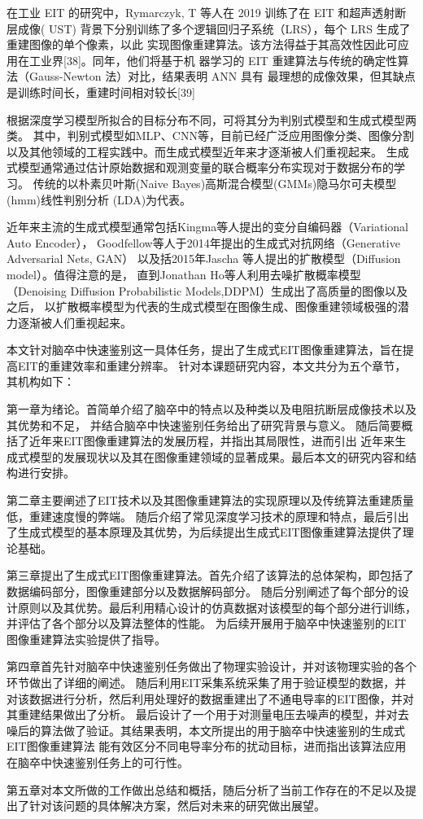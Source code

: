在工业 EIT 的研究中，Rymarczyk, T 等人在 2019 训练了在 EIT 和超声透射断层成像( UST)
背景下分别训练了多个逻辑回归子系统（LRS），每个 LRS 生成了重建图像的单个像素，以此
实现图像重建算法。该方法得益于其高效性因此可应用在工业界[38]。同年，他们将基于机
器学习的 EIT 重建算法与传统的确定性算法（Gauss-Newton 法）对比，结果表明 ANN 具有
最理想的成像效果，但其缺点是训练时间长，重建时间相对较长[39]


根据深度学习模型所拟合的目标分布不同，可将其分为判别式模型和生成式模型两类。
其中，判别式模型如MLP、CNN等，目前已经广泛应用图像分类、图像分割以及其他领域的工程实践中。而生成式模型近年来才逐渐被人们重视起来。
生成式模型通常通过估计原始数据和观测变量的联合概率分布实现对于数据分布的学习。
传统的以朴素贝叶斯(Naive Bayes)高斯混合模型(GMMs)隐马尔可夫模型(hmm)线性判别分析 (LDA)为代表。

近年来主流的生成式模型通常包括Kingma等人提出的变分自编码器（Variational Auto Encoder）\cite{2013Auto}，
Goodfellow等人于2014年提出的生成式对抗网络\cite{2014Generative}（Generative Adversarial Nets, GAN）
以及括2015年Jascha 等人提出的扩散模型\cite{DiffusionModel}（Diffusion model）。值得注意的是，
直到Jonathan Ho等人利用去噪扩散概率模型\cite{DDPM}（Denoising Diffusion Probabilistic Models,DDPM）生成出了高质量的图像以及之后，
以扩散概率模型为代表的生成式模型在图像生成、图像重建领域极强的潜力逐渐被人们重视起来。


本文针对脑卒中快速鉴别这一具体任务，提出了生成式EIT图像重建算法，旨在提高EIT的重建效率和重建分辨率。
针对本课题研究内容，本文共分为五个章节，其机构如下：

第一章为绪论。首简单介绍了脑卒中的特点以及种类以及电阻抗断层成像技术以及其优势和不足，
并结合脑卒中快速鉴别任务给出了研究背景与意义。 随后简要概括了近年来EIT图像重建算法的发展历程，并指出其局限性，进而引出
近年来生成式模型的发展现状以及其在图像重建领域的显著成果。最后本文的研究内容和结构进行安排。

第二章主要阐述了EIT技术以及其图像重建算法的实现原理以及传统算法重建质量低，重建速度慢的弊端。
随后介绍了常见深度学习技术的原理和特点，最后引出了生成式模型的基本原理及其优势，为后续提出生成式EIT图像重建算法提供了理论基础。

第三章提出了生成式EIT图像重建算法。首先介绍了该算法的总体架构，即包括了数据编码部分，图像重建部分以及数据解码部分。
随后分别阐述了每个部分的设计原则以及其优势。最后利用精心设计的仿真数据对该模型的每个部分进行训练，并评估了各个部分以及算法整体的性能。
为后续开展用于脑卒中快速鉴别的EIT图像重建算法实验提供了指导。

第四章首先针对脑卒中快速鉴别任务做出了物理实验设计，并对该物理实验的各个环节做出了详细的阐述。
随后利用EIT采集系统采集了用于验证模型的数据，并对该数据进行分析，然后利用处理好的数据重建出了不通电导率的EIT图像，并对其重建结果做出了分析。
最后设计了一个用于对测量电压去噪声的模型，并对去噪后的算法做了验证。其结果表明，本文所提出的用于脑卒中快速鉴别的生成式EIT图像重建算法
能有效区分不同电导率分布的扰动目标，进而指出该算法应用在脑卒中快速鉴别任务上的可行性。

第五章对本文所做的工作做出总结和概括，随后分析了当前工作存在的不足以及提出了针对该问题的具体解决方案，然后对未来的研究做出展望。